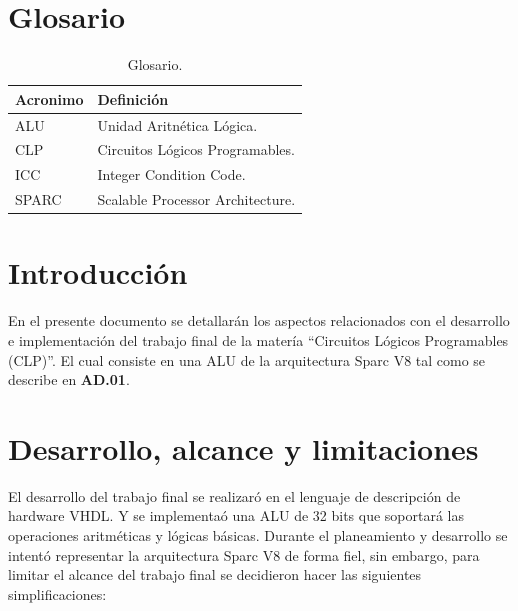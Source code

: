 \documentclass[
  11pt, %
  codirector, %
]{charter}
\begin{document}
\section*{Glosario}
\label{sec:glossary}

\begin{table}[h!]
	\centering
	\begin{tabular}{ | m{4.5cm} | m{10.5cm} | }
		\hline
		\rowcolor{gray!50} %
		\textbf{Acronimo} & \textbf{Definición} \\ \hline
    ALU  & Unidad Aritnética Lógica. \\ \hline
    CLP  & Circuitos Lógicos Programables. \\ \hline
    ICC & Integer Condition Code. \\ \hline
    SPARC  & Scalable Processor Architecture. \\ \hline
	\end{tabular}
  \caption{Glosario.}
  \label{tab:glossary}

\end{table}
\pagebreak


\section{Introducción}
\label{sec:org60390fa}

En el presente documento se detallarán los aspectos relacionados con el desarrollo e implementación del trabajo final de la matería ``Circuitos Lógicos Programables (CLP)''. El cual consiste en una ALU de la arquitectura Sparc V8 tal como se describe en \textbf{AD.01}.

\section{Desarrollo, alcance y limitaciones}
\label{sec:orgaf51da6}

El desarrollo del trabajo final se realizaró en el lenguaje de descripción de
hardware VHDL. Y se implementaó una ALU de 32 bits que soportará las operaciones
aritméticas y lógicas básicas. Durante el planeamiento y desarrollo se intentó
representar la arquitectura Sparc V8 de forma fiel, sin embargo, para limitar el
alcance del trabajo final se decidieron hacer las siguientes simplificaciones:
\end{document}
